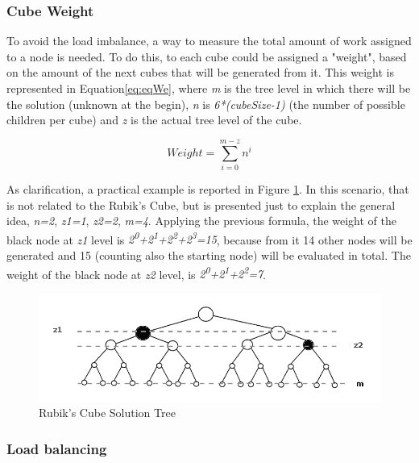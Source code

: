 \documentclass[a4paper]{article}
\begin{document}
\subsubsection{Cube Weight}
\label{sec:cw}

To avoid the load imbalance, a way to measure the total amount of work assigned to a node is needed. To do this, to each cube could be assigned a "weight", based on the amount of the next cubes that will be generated from it. This weight is represented in Equation\ref{eq:eqWe}, where \textit{m} is the tree level in which there will be the solution (unknown at the begin), \textit{n} is \textit{6*(cubeSize-1)} (the number of possible children per cube) and \textit{z} is the actual tree level of the cube.

\begin{equation} 
\label{eq:eqWe}
Weight = \sum_{i=0}^{m-z}{n^i}
\end{equation}
\FloatBarrier

As clarification, a practical example is reported in Figure \ref{fig:treeBin}. In this scenario, that is not related to the Rubik's Cube, but is presented just to explain the general idea, \textit{n=2}, \textit{z1=1}, \textit{z2=2}, \textit{m=4}. Applying the previous formula, the weight of the black node at \textit{z1} level is \textit{2\textsuperscript{0}+2\textsuperscript{1}+2\textsuperscript{2}+2\textsuperscript{3}=15}, because from it 14 other nodes will be generated and 15 (counting also the starting node) will be evaluated in total. The weight of the black node at \textit{z2} level, is \textit{2\textsuperscript{0}+2\textsuperscript{1}+2\textsuperscript{2}=7}. 

\begin{figure}[ht]
  \centering
  \includegraphics[width=0.8\linewidth]{tree_bin}
  \caption{Rubik's Cube Solution Tree}
  \label{fig:treeBin}
\end{figure}
\FloatBarrier

\subsubsection{Load balancing}
\label{sec:lb}
\end{document}
